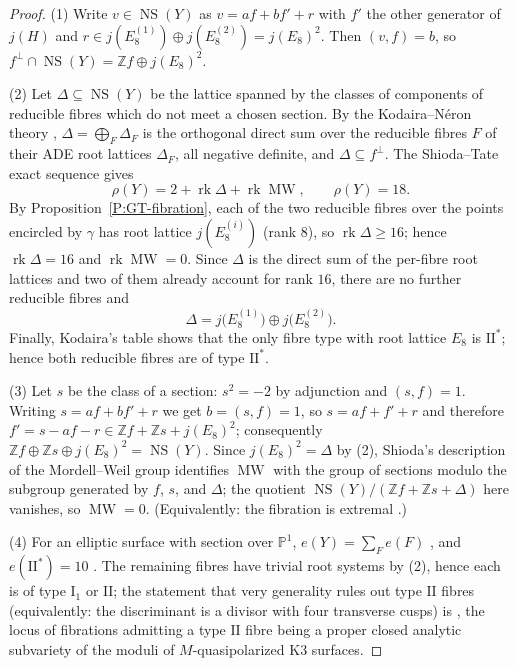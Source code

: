 \documentclass[11pt]{amsart}
\theoremstyle{plain}
\theoremstyle{definition}
\theoremstyle{remark}
\numberwithin{equation}{section}
\begin{document}
\begin{proof}
(1) Write \(v\in\operatorname{NS}(Y)\) as
\(v=af+bf'+r\) with \(f'\) the other generator of \(j(H)\) and
\(r\in j(E_{8}^{(1)})\oplus j(E_{8}^{(2)})=j(E_{8})^{2}\). Then
\((v,f)=b\), so
\(f^{\perp}\cap\operatorname{NS}(Y)=\mathbb Zf\oplus j(E_{8})^{2}\).

(2) Let \(\Delta\subseteq\operatorname{NS}(Y)\) be the lattice spanned by
the classes of components of reducible fibres which do not meet a chosen
section. By the Kodaira--N\'eron theory
\cite{kodaira, miranda}, \(\Delta=\bigoplus_{F}\Delta_{F}\) is the orthogonal
direct sum over the reducible fibres \(F\) of their ADE root lattices
\(\Delta_{F}\), all negative definite, and \(\Delta\subseteq f^{\perp}\). The
Shioda--Tate exact sequence \cite{schuttshioda} gives
\[
\rho(Y)=2+\operatorname{rk}\Delta+\operatorname{rk}\operatorname{MW},
\qquad \rho(Y)=18 .
\]
By Proposition~\ref{P:GT-fibration}, each of the two reducible fibres over
the points encircled by \(\gamma\) has root lattice
\(j(E_{8}^{(i)})\) (rank \(8\)), so
\(\operatorname{rk}\Delta\ge16\); hence
\(\operatorname{rk}\Delta=16\) and \(\operatorname{rk}\operatorname{MW}=0\).
Since \(\Delta\) is the direct sum of the per-fibre root lattices and two of
them already account for rank \(16\), there are no further reducible fibres
and
\[
\Delta=j\bigl(E_{8}^{(1)}\bigr)\oplus j\bigl(E_{8}^{(2)}\bigr).
\]
Finally, Kodaira's table \cite{kodaira, miranda} shows that the only fibre
type with root lattice \(E_{8}\) is \(\mathrm{II}^{*}\); hence both
reducible fibres are of type \(\mathrm{II}^{*}\).

(3) Let \(s\) be the class of a section: \(s^{2}=-2\) by adjunction and
\((s,f)=1\). Writing \(s=af+bf'+r\) we get \(b=(s,f)=1\), so
\(s=af+f'+r\) and therefore
\(f'=s-af-r\in\mathbb Zf+\mathbb Zs+j(E_{8})^{2}\); consequently
\(\mathbb Zf\oplus\mathbb Zs\oplus j(E_{8})^{2}=\operatorname{NS}(Y)\).
Since \(j(E_{8})^{2}=\Delta\) by (2), Shioda's description of the
Mordell--Weil group \cite{schuttshioda} identifies
\(\operatorname{MW}\) with the group of sections modulo the subgroup
generated by \(f\), \(s\), and \(\Delta\); the quotient
\(\operatorname{NS}(Y)/(\mathbb Zf+\mathbb Zs+\Delta)\) here vanishes, so
\(\operatorname{MW}=0\). (Equivalently: the fibration is extremal
\cite{schuttshioda}.)

(4) For an elliptic surface with section over \(\mathbb P^{1}\),
\(e(Y)=\sum_{F}e(F)\) \cite{miranda}, and \(e(\mathrm{II}^{*})=10\)
\cite{kodaira}. The remaining fibres have trivial root systems by (2), hence
each is of type \(\mathrm I_{1}\) or \(\mathrm{II}\); the statement that
very generality rules out type \(\mathrm{II}\) fibres (equivalently: the
discriminant is a divisor with four transverse cusps) is
\cite[\S 4]{dfk3slpms}, the locus of fibrations admitting a type
\(\mathrm{II}\) fibre being a proper closed analytic subvariety of the moduli
of \(M\)-quasipolarized K3 surfaces.
\end{proof}
\end{document}
